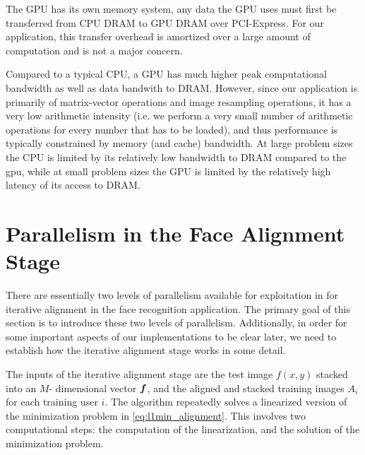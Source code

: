 \documentclass[10pt,twocolumn,letterpaper]{article}
\begin{document}
The GPU has its own memory system, any data the GPU uses must first be
transferred from CPU DRAM to GPU DRAM over PCI-Express.  For our application,
this transfer overhead is amortized over a large amount of computation and is
not a major concern.

Compared to a typical CPU, a GPU has much higher peak computational bandwidth
as well as data bandwith to DRAM.  However, since our application is primarily
of matrix-vector operations and image resampling operations, it has a very low
arithmetic intensity (i.e. we perform a very small number of arithmetic
operations for every number that has to be loaded), and thus performance is
typically constrained by memory (and cache) bandwidth.  At large problem sizes
the CPU is limited by its relatively low bandwidth to DRAM compared to the gpu,
while at small problem sizes the GPU is limited by the relatively high latency
of its access to DRAM. 

\section{Parallelism in the Face Alignment Stage}
\label{sec:alignment}
There are essentially two levels of parallelism available for exploitation in
for iterative alignment in the face recognition application.  The primary goal
of this section is to introduce these two levels of parallelism.  Additionally,
in order for some important aspects of our implementations to be clear later,
we need to establish how the iterative alignment stage works in some
detail.

The inputs of the iterative alignment stage are the test image $f(x,y)$ stacked into an $M$-
dimensional vector $\boldsymbol{f}$, and the aligned and stacked training images $A_i$ for
each training user $i$. 
The algorithm repeatedly solves a linearized version of the minimization problem
in \eqref{eq:l1min_alignment}.  This involves two computational steps:
the computation of the linearization, and the solution of the minimization problem.
\end{document}

